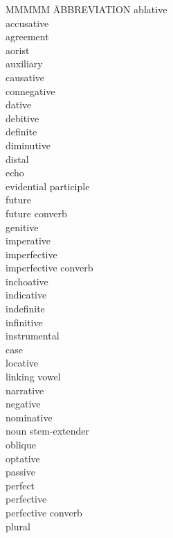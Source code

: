 \addchap{\lsAbbreviationsTitle}
\begin{multicols}{2}
\begin{tabbing}
MMMMM \= ABBREVIATION\kill
\abl \> ablative\\
\acc \> accusative\\
\agr \> agreement\\
\aor \> aorist\\
\aux \> auxiliary\\
\caus \> causative\\
\cn \> connegative\\
\dat \> dative\\
\deb \> debitive\\
 \> definite\\
\dimgloss \> diminutive\\
\dist \> distal\\
\echo \> echo\\
\eptcp \> evidential participle\\
\fut \> future\\
\futcvb \> future converb\\
\gen \> genitive\\
\imp \> imperative\\
\impf \> imperfective\\
\impfcvb \> imperfective converb\\
\inch \> inchoative\\
\ind \> indicative\\
\indf \> indefinite\\
\infgloss \> infinitive\\
\ins \> instrumental\\
\kase \> case\\
\locgloss \> locative\\
\lvgloss \> linking vowel\\
\narr \> narrative\\
\neggloss \> negative\\
\nom \> nominative\\
\nx \> noun stem-extender\\
\obl \> oblique\\
\opt \> optative\\
\pass \> passive\\
\perfect \> perfect \\
\perfective \> perfective\\
\perfcvb \> perfective converb\\
\pl \> plural\\

\end{tabbing}
\end{multicols}
